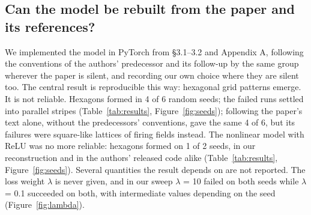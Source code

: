 \documentclass[10pt,letterpaper]{article}
\begin{document}
\subsection{Can the model be rebuilt from the paper and its references?} \label{sec:rebuild}
We implemented the model in PyTorch from §3.1–3.2 and Appendix A, following the conventions of the authors’ predecessor \citep{gao2021path} and its follow-up by the same group wherever the paper is silent, and recording our own choice where they are silent too. The central result is reproducible this way: hexagonal grid patterns emerge. It is not reliable. Hexagons formed in 4 of 6 random seeds; the failed runs settled into parallel stripes (Table~\ref{tab:results}, Figure~\ref{fig:seeds}); following the paper's text alone, without the predecessors' conventions, gave the same 4 of 6, but its failures were square-like lattices of firing fields instead. The nonlinear model with ReLU was no more reliable: hexagons formed on 1 of 2 seeds, in our reconstruction and in the authors' released code alike (Table~\ref{tab:results}, Figure~\ref{fig:seeds}). Several quantities the result depends on are not reported. The loss weight $\lambda$ is never given, and in our sweep $\lambda$ = 10 failed on both seeds while $\lambda$ = 0.1 succeeded on both, with intermediate values depending on the seed (Figure~\ref{fig:lambda}).
\end{document}
